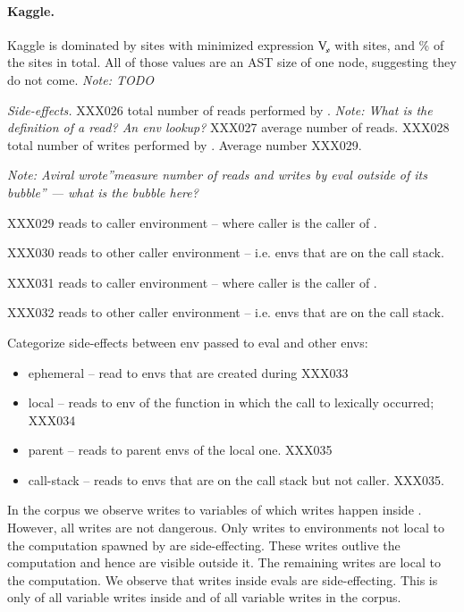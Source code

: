 \documentclass[screen,acmsmall]{acmart}
\newcommand{\mypara}[1]{\medskip\noindent\emph{#1}\xspace}
\newcommand{\NOTE}[1]{{\it Note: #1}\xspace}
\begin{document}
\paragraph{Kaggle.} Kaggle is dominated by sites with minimized expression \c{V}, with \kaggleMinimizedcallsitesa sites, and  \kaggleMinimizedpropsitesa\% of the \kaggleNbCallSites sites in total. All of those values are an AST size of one node, suggesting they do not come. \NOTE{TODO}





\mypara{Side-effects.} XXX026 total number of reads performed by
\eval. \NOTE{What is the definition of a read? An env lookup?} XXX027
average number of reads. XXX028 total number of writes performed by
\eval. Average number XXX029.

\NOTE{Aviral wrote''measure number of reads and writes by eval outside
  of its bubble'' --- what is the bubble here?}

XXX029 reads to caller environment -- where caller is the caller of
\eval.

XXX030 reads to other caller environment -- i.e. envs that are on the
call stack.

XXX031 reads to caller environment -- where caller is the caller of
\eval.

XXX032 reads to other caller environment -- i.e. envs that are on the
call stack.

Categorize side-effects between env passed to eval and other envs:
\begin{itemize}
\item ephemeral -- read to envs that are created during \eval  XXX033
\item local -- reads to env of the function in which the call to \eval
  lexically occurred; XXX034
\item parent -- reads to parent envs of the local one. XXX035
\item call-stack -- reads to envs that are on the call stack but not
  caller. XXX035.
\end{itemize}

In the corpus we observe \AllWritesRnd writes to variables of which
\EvalWritesRnd writes happen inside \eval. However, all writes are not
dangerous. Only writes to environments not local to the computation
spawned by \eval are side-effecting. These writes outlive the
computation and hence are visible outside it. The remaining writes are
local to the computation. We observe that \EvalSideEffectingWritesRnd
writes inside evals are side-effecting. This is only
\EvalSideEffectingWritesEvalPerc of all variable writes inside \eval
and \EvalSideEffectingWritesAllPerc of all variable writes in the
corpus.
\end{document}

